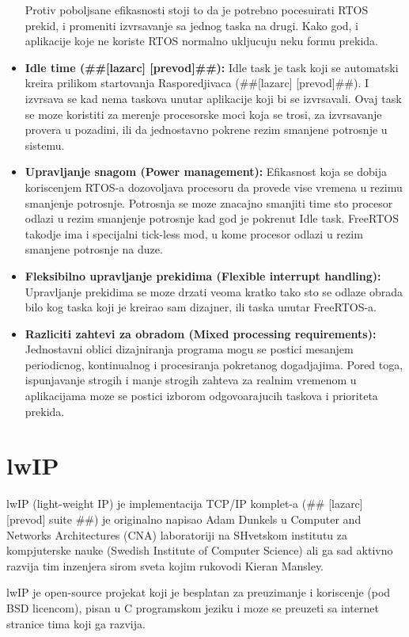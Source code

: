 \documentclass[a4paper,12pt, master]{etf}
\begin{document}
\begin{itemize}
		Protiv poboljsane efikasnosti stoji to da je potrebno pocesuirati RTOS prekid, i 
		promeniti izvrsavanje sa jednog taska na drugi. Kako god, i aplikacije koje ne koriste 
		RTOS normalno ukljucuju neku formu prekida.
		\item \textbf{Idle time (\#\#[lazarc] [prevod]\#\#):}
		Idle task je task koji se automatski kreira prilikom startovanja Rasporedjivaca
		(\#\#[lazarc] [prevod]\#\#). I izvrsava se kad nema taskova unutar aplikacije koji bi 
		se izvrsavali. Ovaj task se moze koristiti za merenje procesorske moci koja se trosi, 
		za izvrsavanje provera u pozadini, ili da jednostavno pokrene rezim smanjene potrosnje 
		u sistemu.
		\item \textbf{Upravljanje snagom (Power management):}
		Efikasnost koja se dobija koriscenjem RTOS-a dozovoljava procesoru da provede vise 
		vremena	u rezimu smanjenje potrosnje. Potrosnja se moze znacajno smanjiti time sto 
		procesor odlazi u rezim smanjenje potrosnje kad god je pokrenut Idle task. FreeRTOS 
		takodje ima i specijalni tick-less mod, u kome procesor odlazi u rezim smanjene 
		potrosnje na duze.
		\item \textbf{Fleksibilno upravljanje prekidima (Flexible interrupt handling):}
		Upravljanje prekidima se moze drzati veoma kratko tako sto se odlaze obrada bilo kog 
		taska koji je kreirao sam dizajner, ili taska unutar FreeRTOS-a.
		\item \textbf{Razliciti zahtevi za obradom (Mixed processing requirements):}
		Jednostavni oblici dizajniranja programa mogu se postici mesanjem periodicnog, 
		kontinualnog i procesiranja pokretanog dogadjajima. Pored toga, ispunjavanje strogih i 
		manje strogih zahteva za realnim vremenom u aplikacijama moze se postici izborom 
		odgovoarajucih taskova i prioriteta prekida.

	\end{itemize}

	\section{lwIP}

	lwIP (light-weight IP) je implementacija TCP/IP komplet-a (\#\# [lazarc] [prevod] suite 
	\#\#) je originalno napisao Adam Dunkels u Computer and Networks Architectures (CNA) 
	laboratoriji na	SHvetskom institutu za kompjuterske nauke (Swedish Institute of Computer 
	Science) ali ga sad	aktivno razvija tim inzenjera sirom sveta kojim rukovodi Kieran 
	Mansley.

	lwIP je open-source projekat koji je besplatan za preuzimanje i koriscenje (pod BSD 
	licencom), pisan u C programskom jeziku i moze se preuzeti sa internet stranice tima koji 
	ga razvija.
\end{document}
